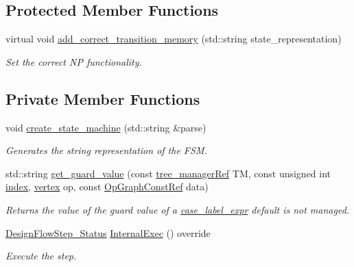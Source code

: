 \subsection*{Protected Member Functions}
\begin{DoxyCompactItemize}
\item 
virtual void \hyperlink{classfsm__controller_a80e22f1c0437e36734f4339828e44e68}{add\+\_\+correct\+\_\+transition\+\_\+memory} (std\+::string state\+\_\+representation)
\begin{DoxyCompactList}\small\item\em Set the correct NP functionality. \end{DoxyCompactList}\end{DoxyCompactItemize}
\subsection*{Private Member Functions}
\begin{DoxyCompactItemize}
\item 
void \hyperlink{classfsm__controller_ab27526609ea8054ed2dfc08112900892}{create\+\_\+state\+\_\+machine} (std\+::string \&parse)
\begin{DoxyCompactList}\small\item\em Generates the string representation of the F\+SM. \end{DoxyCompactList}\item 
std\+::string \hyperlink{classfsm__controller_ac82a6e93ab9750f50a8565b72e1a028b}{get\+\_\+guard\+\_\+value} (const \hyperlink{tree__manager_8hpp_a96ff150c071ce11a9a7a1e40590f205e}{tree\+\_\+manager\+Ref} TM, const unsigned int \hyperlink{tutorial__pact__2019_2Introduction_2third_2include_2Keccak_8h_a028c9bdc8344cca38ab522a337074797}{index}, \hyperlink{graph_8hpp_abefdcf0544e601805af44eca032cca14}{vertex} op, const \hyperlink{op__graph_8hpp_a9a0b240622c47584bee6951a6f5de746}{Op\+Graph\+Const\+Ref} data)
\begin{DoxyCompactList}\small\item\em Returns the value of the guard value of a \hyperlink{structcase__label__expr}{case\+\_\+label\+\_\+expr} default is not managed. \end{DoxyCompactList}\item 
\hyperlink{design__flow__step_8hpp_afb1f0d73069c26076b8d31dbc8ebecdf}{Design\+Flow\+Step\+\_\+\+Status} \hyperlink{classfsm__controller_a7fd76ef3d980cdcc8451bfd2e3ea3537}{Internal\+Exec} () override
\begin{DoxyCompactList}\small\item\em Execute the step. \end{DoxyCompactList}\end{DoxyCompactItemize}
